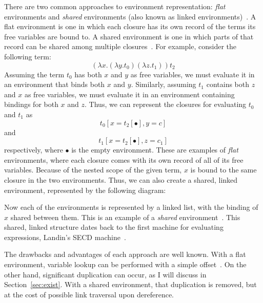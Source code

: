 There are two common approaches to environment representation: \emph{flat}
environments and \emph{shared} environments (also known as linked
environments)~\cite{appel1988optimizing,shao1994space}. A flat environment is
one in which each closure has its own record of the terms its free variables are
bound to. A shared environment is one in which parts of that record can be
shared among multiple closures~\cite{appel1988optimizing,shao1994space}. For
example, consider the following term: $$(\lambda x.(\lambda y.t_0) (\lambda
z.t_1)) t_2$$ Assuming the term $t_0$ has both $x$ and $y$ as free variables, we
must evaluate it in an environment that binds both $x$ and $y$.  Similarly,
assuming $t_1$ contains both $z$ and $x$ as free variables, we must evaluate it
in an environment containing bindings for both $x$ and $z$. Thus, we can
represent the closures for evaluating $t_0$ and $t_1$  as $$t_0[x=t_2[\bullet],
y=c]$$ and $$t_1[x=t_2[\bullet], z=c_1]$$ respectively, where $\bullet$ is the
empty environment.  These are examples of \emph{flat} environments, where each
closure comes with its own record of all of its free variables. Because of the
nested scope of the given term, $x$ is bound to the same closure in the two
environments. Thus, we can also create a shared, linked environment,
represented by the following diagram:

\begin{center}
\end{center}
Now each of the environments is represented by a linked list, with the binding
of $x$ shared between them. This is an example of a \emph{shared}
environment~\cite{appel1988optimizing}. This shared, linked structure dates back
to the first machine for evaluating expressions, Landin's SECD
machine~\cite{landin1964mechanical}.

The drawbacks and advantages of each approach are well known. With a flat
environment, variable lookup can be performed with a simple
offset~\cite{jonesstg,appel1992compiling}. On the other hand, significant
duplication can occur, as I will discuss in Section~\ref{sec:exist}.  With a
shared environment, that duplication is removed, but at the cost of possible
link traversal upon dereference. 

